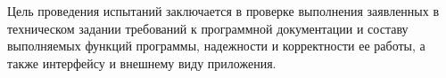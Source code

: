 Цель проведения испытаний заключается в проверке выполнения заявленных в
техническом задании требований к программной документации и составу выполняемых
функций программы, надежности и корректности ее работы, а также интерфейсу и
внешнему виду приложения.